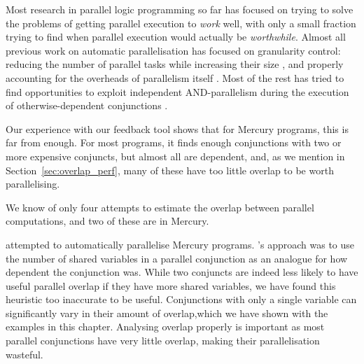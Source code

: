 
Most research in parallel logic programming so far
has focused on trying to solve the problems
of getting parallel execution to \emph{work} well,
with only a small fraction trying to find
when parallel execution would actually be \emph{worthwhile}.
Almost all previous work on automatic parallelisation
has focused on granularity control:
reducing the number of parallel tasks while increasing their size
\citep{lopez96:granularity},
and properly accounting for the overheads
of parallelism itself \citep{shen_98_granularity-control}.
Most of the rest has tried to find opportunities
to exploit independent AND-parallelism
during the execution of otherwise-dependent conjunctions
\citep{DBLP:journals/jlp/MuthukumarBBH99,DBLP:conf/lopstr/CasasCH07}.

Our experience with our feedback tool shows that
for Mercury programs, this is far from enough.
For most programs,
it finds enough conjunctions with two or more expensive conjuncts,
but almost all are dependent,
and, as we mention in Section~\ref{sec:overlap_perf},
many of these have too little overlap to be worth parallelising.

We know of only four attempts to estimate the overlap
between parallel computations,
and two of these are in Mercury.

\citet*{tannier:2007:parallel_mercury} attempted to automatically parallelise
Mercury programs.
\citeauthor{tannier:2007:parallel_mercury}'s
approach was to use the number of shared variables in a parallel
conjunction as an analogue for how dependent the conjunction was.
While two conjuncts are indeed less likely
to have useful parallel overlap if they have more shared variables,
we have found this heuristic too inaccurate to be useful.
Conjunctions with only a single variable can significantly vary in
their amount of overlap,which we have shown with the examples in this
chapter.
Analysing overlap properly is important as most parallel conjunctions have
very little overlap,
making their parallelisation wasteful.


